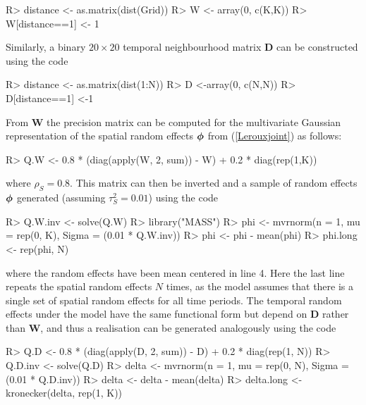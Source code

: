 \documentclass[article, nojss]{jss}
\newcommand{\bd}[1]{\ensuremath{\mbox{\boldmath $#1$}}}
\begin{document}
\begin{Schunk}
\begin{Sinput}
R>  distance <- as.matrix(dist(Grid))
R>  W <- array(0, c(K,K))
R>  W[distance==1] <- 1
\end{Sinput}
\end{Schunk}



Similarly, a binary $20\times 20$ temporal neighbourhood matrix $\mathbf{D}$ can be constructed using the code

\begin{Schunk}
\begin{Sinput}
R>  distance <- as.matrix(dist(1:N))
R>  D <-array(0, c(N,N))
R>  D[distance==1] <-1
\end{Sinput}
\end{Schunk}

From $\mathbf{W}$ the precision matrix can be computed for the multivariate Gaussian representation of the spatial random effects $\bd{\phi}$ from  (\ref{Lerouxjoint}) as follows:

\begin{Schunk}
\begin{Sinput}
R>  Q.W <- 0.8 * (diag(apply(W, 2, sum)) - W) + 0.2 * diag(rep(1,K))
\end{Sinput}
\end{Schunk}

where $\rho_S=0.8$. This matrix can then be inverted and a sample of random effects $\bd{\phi}$ generated (assuming $\tau^2_S=0.01$) using the code

\begin{Schunk}
\begin{Sinput}
R>  Q.W.inv <- solve(Q.W)
R>  library("MASS")
R>  phi <- mvrnorm(n = 1, mu = rep(0, K), Sigma = (0.01 * Q.W.inv))
R>  phi <- phi - mean(phi)
R>  phi.long <- rep(phi, N)
\end{Sinput}
\end{Schunk}

where the random effects have been mean centered in line 4. Here the last line repeats the spatial random effects $N$ times, as the  model assumes that there is a single set of spatial random effects for all time periods. The temporal random effects under the  model have the same functional form but depend on $\mathbf{D}$ rather than $\mathbf{W}$, and thus a realisation can be generated analogously using the code


\begin{Schunk}
\begin{Sinput}
R>  Q.D <- 0.8 * (diag(apply(D, 2, sum)) - D) + 0.2 * diag(rep(1, N))
R>  Q.D.inv <- solve(Q.D)
R>  delta <- mvrnorm(n = 1, mu = rep(0, N), Sigma = (0.01 * Q.D.inv))
R>  delta <- delta - mean(delta)
R>  delta.long <- kronecker(delta, rep(1, K))
\end{Sinput}
\end{Schunk}
\end{document}
